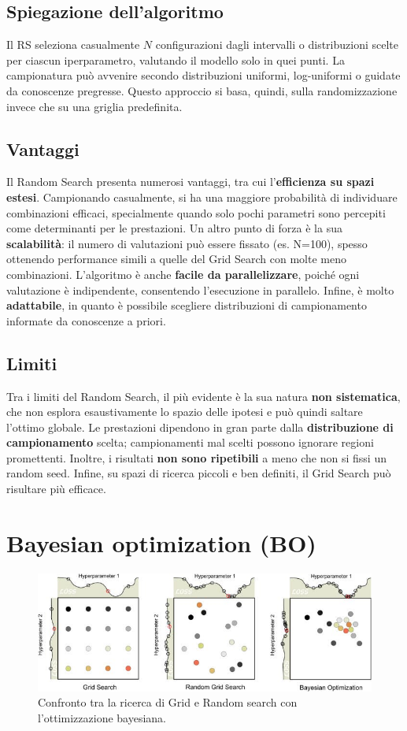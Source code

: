 \documentclass[a4paper,12pt]{report}
\begin{document}
	\subsection{Spiegazione dell'algoritmo}
	Il RS seleziona casualmente $N$ configurazioni dagli intervalli o distribuzioni scelte per ciascun iperparametro, valutando il modello solo in quei punti. La campionatura può avvenire secondo distribuzioni uniformi, log-uniformi o guidate da conoscenze pregresse. Questo approccio si basa, quindi, sulla randomizzazione invece che su una griglia predefinita.
	
	\subsection{Vantaggi}
	Il Random Search presenta numerosi vantaggi, tra cui l'\textbf{efficienza su spazi estesi}. Campionando casualmente, si ha una maggiore probabilità di individuare combinazioni efficaci, specialmente quando solo pochi parametri sono percepiti come determinanti per le prestazioni. Un altro punto di forza è la sua \textbf{scalabilità}: il numero di valutazioni può essere fissato (es. N=100), spesso ottenendo performance simili a quelle del Grid Search con molte meno combinazioni. L'algoritmo è anche \textbf{facile da parallelizzare}, poiché ogni valutazione è indipendente, consentendo l'esecuzione in parallelo. Infine, è molto \textbf{adattabile}, in quanto è possibile scegliere distribuzioni di campionamento informate da conoscenze a priori.
	
	\subsection{Limiti}
	Tra i limiti del Random Search, il più evidente è la sua natura \textbf{non sistematica}, che non esplora esaustivamente lo spazio delle ipotesi e può quindi saltare l'ottimo globale. Le prestazioni dipendono in gran parte dalla \textbf{distribuzione di campionamento} scelta; campionamenti mal scelti possono ignorare regioni promettenti. Inoltre, i risultati \textbf{non sono ripetibili} a meno che non si fissi un random seed. Infine, su spazi di ricerca piccoli e ben definiti, il Grid Search può risultare più efficace.
	
	\section{Bayesian optimization (BO)}
	\begin{figure}[H]
		\centering
		\includegraphics[width=1.0\textwidth]{img/bo.jpg}
		\caption{Confronto tra la ricerca di Grid e Random search con l'ottimizzazione bayesiana.}
	\end{figure}
\end{document}
